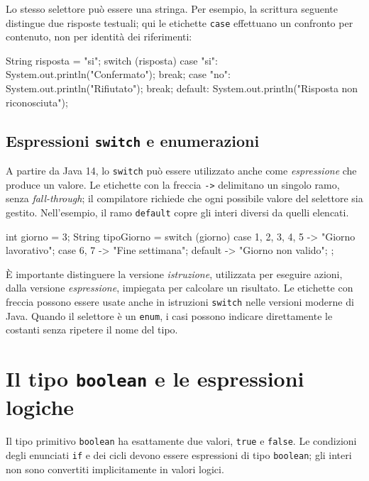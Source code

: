 Lo stesso selettore può essere una stringa. Per esempio, la
scrittura seguente distingue due risposte testuali; qui le
etichette \texttt{case} effettuano un confronto per contenuto,
non per identità dei riferimenti:

\begin{unipdcode}[language=Java]
String risposta = "si";
switch (risposta) {
    case "si":
        System.out.println("Confermato");
        break;
    case "no":
        System.out.println("Rifiutato");
        break;
    default:
        System.out.println("Risposta non riconosciuta");
}
\end{unipdcode}

\subsection{Espressioni \texttt{switch} e enumerazioni}
\label{sec:fi-java-cicli-switch-expression}

A partire da Java 14, lo \texttt{switch} può essere utilizzato
anche come \emph{espressione} che produce un valore. Le etichette
con la freccia \texttt{->} delimitano un singolo ramo, senza
\emph{fall-through}; il compilatore richiede che ogni possibile
valore del selettore sia gestito. Nell'esempio, il ramo
\texttt{default} copre gli interi diversi da quelli elencati.

\begin{unipdcode}[language=Java]
int giorno = 3;
String tipoGiorno = switch (giorno) {
    case 1, 2, 3, 4, 5 -> "Giorno lavorativo";
    case 6, 7 -> "Fine settimana";
    default -> "Giorno non valido";
};
\end{unipdcode}

È importante distinguere la versione \emph{istruzione}, utilizzata
per eseguire azioni, dalla versione \emph{espressione}, impiegata
per calcolare un risultato. Le etichette con freccia possono essere
usate anche in istruzioni \texttt{switch} nelle versioni moderne
di Java. Quando il selettore è un \texttt{enum}, i casi possono
indicare direttamente le costanti senza ripetere il nome del tipo.

\section{Il tipo \texttt{boolean} e le espressioni logiche}
\label{sec:fi-java-cicli-boolean}

\begin{definition}
\label{def:fi-java-cicli-boolean}
Il tipo primitivo \texttt{boolean} ha esattamente due valori,
\texttt{true} e \texttt{false}. Le condizioni degli enunciati
\texttt{if} e dei cicli devono essere espressioni di tipo
\texttt{boolean}; gli interi non sono convertiti implicitamente
in valori logici.
\end{definition}

